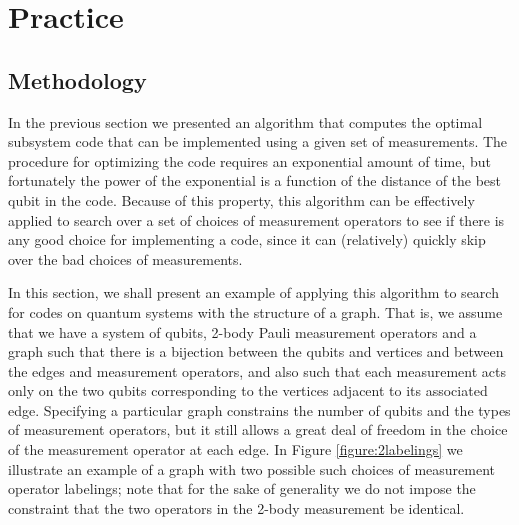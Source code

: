 \documentclass[twocolumn,showpacs,preprintnumbers,amsmath,amssymb,nofootinbib,pra,floatfix]{revtex4-1}
\begin{document}
\section{Practice} \label{sec:lattice}
\subsection{Methodology} \label{sec:methodology}

In the previous section we presented an algorithm that computes the optimal subsystem code that can be implemented using a given set of measurements.  The procedure for optimizing the code requires an exponential amount of time, but fortunately the power of the exponential is a function of the distance of the best qubit in the code.   Because of this property, this algorithm can be effectively applied to search over a set of choices of measurement operators to see if there is any good choice for implementing a code, since it can (relatively) quickly skip over the bad choices of measurements.

In this section, we shall present an example of applying this algorithm to search for codes on quantum systems with the structure of a graph.  That is, we assume that we have a system of qubits, 2-body Pauli measurement operators and a graph such that there is a bijection between the qubits and vertices and between the edges and measurement operators, and also such that each measurement acts only on the two qubits corresponding to the vertices adjacent to its associated edge.  Specifying a particular graph constrains the number of qubits and the types of measurement operators, but it still allows a great deal of freedom in the choice of the measurement operator at each edge.  In Figure \ref{figure:2labelings} we illustrate an example of a graph with two possible such choices of measurement operator labelings;  note that for the sake of generality we do not impose the constraint that the two operators in the 2-body measurement be identical.
\end{document}
